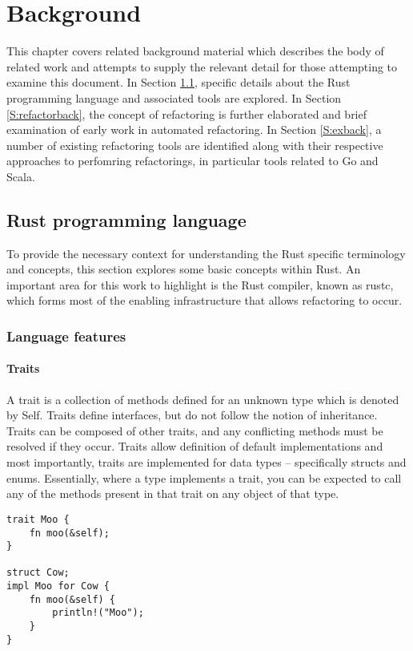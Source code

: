 \chapter{Background}\label{C:back} 
This chapter covers related background material which describes the body of related work and attempts to supply the relevant detail for those attempting to examine this document. In Section \ref{S:rustback}, specific details about the Rust programming language and associated tools are explored. In Section \ref{S:refactorback}, the concept of refactoring is further elaborated and brief examination of early work in automated refactoring. In Section \ref{S:exback}, a number of existing refactoring tools are identified along with their respective approaches to perfomring refactorings, in particular tools related to Go and Scala. 

\section{Rust programming language}\label{S:rustback}
To provide the necessary context for understanding the Rust specific terminology and concepts, this section explores some basic concepts within Rust. An important area for this work to highlight is the Rust compiler, known as rustc, which forms most of the enabling infrastructure that allows refactoring to occur.

\subsection{Language features}
\subsubsection{Traits}
A trait is a collection of methods defined for an unknown type which is denoted by Self. Traits define interfaces, but do not follow the notion of inheritance. Traits can be composed of other traits, and any conflicting methods must be resolved if they occur. Traits allow definition of default implementations and most importantly, traits are implemented for data types -- specifically structs and enums. Essentially, where a type implements a trait, you can be expected to call any of the methods present in that trait on any object of that type. 

\begin{verbatim}
trait Moo {
    fn moo(&self); 
}

struct Cow;
impl Moo for Cow {
    fn moo(&self) {
        println!("Moo");
    }
}
\end{verbatim}

